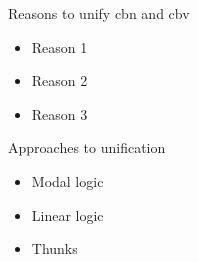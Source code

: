 \documentclass{beamer}
\theoremstyle{definition}
\begin{document}
  \begin{frame}{Reasons to unify cbn and cbv}
    \begin{itemize}
      \item[\textbullet] Reason 1
      \item[\textbullet] Reason 2
      \item[\textbullet] Reason 3
    \end{itemize}
  \end{frame}
  \begin{frame}{Approaches to unification}
    \begin{itemize}
      \item[\textbullet] Modal logic
      \item[\textbullet] Linear logic
      \item[\textbullet] Thunks
    \end{itemize}
  \end{frame}
\end{document}

